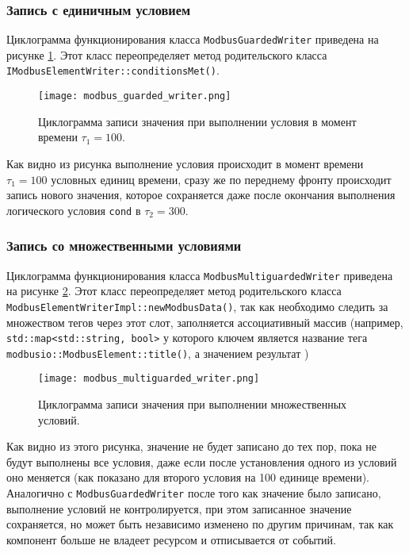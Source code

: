 \subsubsection{Запись с единичным условием}\label{sec:guard}
Циклограмма функционирования класса \texttt{ModbusGuardedWriter} приведена на рисунке \ref{fig:modbus_guarded_writed}.
Этот класс переопределяет метод родительского класса \texttt{IModbusElementWriter::conditionsMet()}.
\begin{center}
    \begin{figure}[h!]
        \texttt{[image: modbus\_guarded\_writer.png]}
        \caption{Циклограмма записи значения при выполнении условия в момент времени $\tau_1=100$.}\label{fig:modbus_guarded_writed}
    \end{figure}
\end{center}
Как видно из рисунка выполнение условия происходит в момент времени $\tau_1=100$ условных единиц времени,
сразу же по переднему фронту происходит запись нового значения, которое сохраняется даже после окончания
выполнения логического условия \texttt{cond} в $\tau_2=300$.


\subsubsection{Запись со множественными условиями}
Циклограмма функционирования класса \texttt{ModbusMultiguardedWriter} приведена на рисунке \ref{fig:modbus_multiguarded_writed}.
Этот класс переопределяет метод родительского класса \texttt{ModbusElementWriterImpl::newModbusData()},
так как необходимо следить за множеством тегов через этот слот,
заполняется ассоциативный массив (например, \texttt{std::map<std::string, bool>} у которого ключем является
название тега \texttt{modbusio::ModbusElement::title()}, а значением результат )
\begin{center}
    \begin{figure}[h!]
        \texttt{[image: modbus\_multiguarded\_writer.png]}
        \caption{Циклограмма записи значения при выполнении множественных условий.}\label{fig:modbus_multiguarded_writed}
    \end{figure}
\end{center}
Как видно из этого рисунка, значение не будет записано до тех пор, пока не будут
выполнены все условия, даже если после установления одного из условий оно меняется
(как показано для второго условия на 100 единице времени). Аналогично с \texttt{ModbusGuardedWriter}
после того как значение было записано, выполнение условий не контролируется, 
при этом записанное значение сохраняется, но может быть независимо изменено по другим причинам,
так как компонент больше не владеет ресурсом и отписывается от событий.


